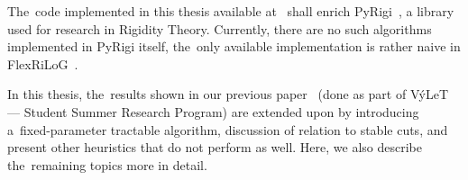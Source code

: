 The~code implemented in this thesis available at~\cite{my_code}
shall enrich PyRigi~\cite{pyrigi},
a library used for research in Rigidity Theory.
Currently, there are no such algorithms implemented in PyRigi itself,
the~only available implementation is rather naive in FlexRiLoG~\cite{flexrilog}.

In this thesis, the~results shown in our previous paper~\cite{my_paper}
(done as part of VýLeT --- Student Summer Research Program)
are extended upon by introducing a~fixed-parameter tractable algorithm,
discussion of relation to stable cuts,
and present other heuristics that do not perform as well.
Here, we also describe the~remaining topics more in detail.

